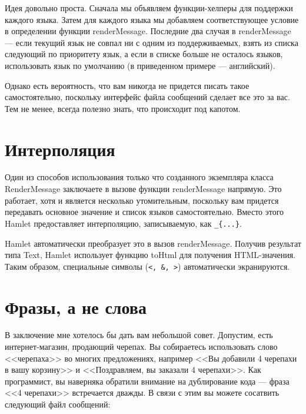 Идея довольно проста. Сначала мы объявляем функции-хелперы для поддержки каждого языка. Затем для каждого языка мы добавляем соответствующее условие в определении функции renderMessage. Последние два случая в renderMessage --- если текущий язык не совпал ни с одним из поддерживаемых, взять из списка следующий по приоритету язык, а если в списке больше не осталось языков, использовать язык по умолчанию (в приведенном примере --- английский).

Однако есть вероятность, что вам никогда не придется писать такое самостоятельно, поскольку интерфейс файла сообщений сделает все это за вас. Тем не менее, всегда полезно знать, что происходит под капотом.

\section{Интерполяция} %

Один из способов использования только что созданного экземпляра класса RenderMessage заключаете в вызове функции renderMessage напрямую. Это работает, хотя и является несколько утомительным, поскольку вам придется передавать основное значение и список языков самостоятельно. Вместо этого Hamlet предоставляет интерполяцию, записываемую, как \lstinline'_{...}'.


Hamlet автоматически преобразует это в вызов renderMessage. Получив результат типа Text, Hamlet использует функцию toHtml для получения HTML-значения. Таким образом, специальные символы (\lstinline'<, &, >') автоматически экранируются.

\section{Фразы, а не слова} %

В заключение мне хотелось бы дать вам небольшой совет. Допустим, есть интернет-магазин, продающий черепах. Вы собираетесь использовать слово <<черепаха>> во многих предложениях, например <<Вы добавили 4 черепахи в вашу корзину>> и <<Поздравляем, вы заказали 4 черепахи>>. Как программист, вы наверняка обратили внимание на дублирование кода --- фраза <<4 черепахи>> встречается дважды. В связи с этим вы можете сосатвить следующий файл сообщений:

